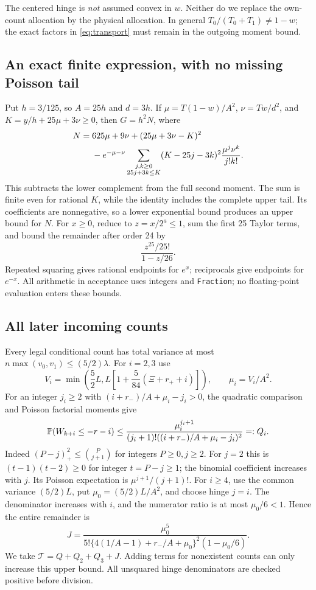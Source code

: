 \documentclass[11pt,a4paper]{article}
\begin{document}
The centered hinge is \emph{not} assumed convex in $w$. Neither do we
replace the own-count allocation by the physical allocation. In general
$T_0/(T_0+T_1)\ne1-w$; the exact factors in \eqref{eq:transport} must
remain in the outgoing moment bound.

\subsection*{An exact finite expression, with no missing Poisson tail}
Put $h=3/125$, so $A=25h$ and $d=3h$. If
$\mu=T(1-w)/A^2$, $\nu=Tw/d^2$, and
$K=y/h+25\mu+3\nu\ge0$, then $G=h^2N$, where
\begin{align}\label{eq:complement}
 N={}&625\mu+9\nu+(25\mu+3\nu-K)^2\\
 &-e^{-\mu-\nu}
 \sum_{\substack{j,k\ge0\\25j+3k\le K}}
       (K-25j-3k)^2\frac{\mu^j\nu^k}{j!k!}.\notag
\end{align}
This subtracts the lower complement from the full second moment. The sum
is finite even for rational $K$, while the identity includes the complete
upper tail. Its coefficients are nonnegative, so a lower exponential bound
produces an upper bound for $N$.
For $x\ge0$, reduce to $z=x/2^a\le1$, sum the first 25 Taylor terms,
and bound the remainder after order 24 by
\[
 \frac{z^{25}/25!}{1-z/26}.
\]
Repeated squaring gives rational endpoints for $e^x$; reciprocals give
endpoints for $e^{-x}$. All arithmetic in acceptance uses integers and
\texttt{Fraction}; no floating-point evaluation enters these bounds.

\subsection*{All later incoming counts}
Every legal conditional count has total variance at most
$n\max(v_0,v_1)\le(5/2)\lambda$. For $i=2,3$ use
\[
 V_i=\min\left(\frac52L,
       L\left[1+\frac5{84}(\Xi+r_++i)\right]\right),\qquad\mu_i=V_i/A^2.
\]
For an integer $j_i\ge2$ with $(i+r_-)/A+\mu_i-j_i>0$, the
quadratic comparison and Poisson factorial moments give
\begin{equation}\label{eq:later}
 \mathbb P(W_{k+i}\le-r-i)\le
 \frac{\mu_i^{j_i+1}}
 {(j_i+1)!((i+r_-)/A+\mu_i-j_i)^2}=:Q_i.
\end{equation}
Indeed $(P-j)_+^2\le\binom P{j+1}$ for integers $P\ge0,j\ge2$.
For $j=2$ this is $(t-1)(t-2)\ge0$ for integer $t=P-j\ge1$;
the binomial coefficient increases with $j$. Its Poisson expectation is
$\mu^{j+1}/(j+1)!$.
For $i\ge4$, use the common variance $(5/2)L$, put $\mu_0=(5/2)L/A^2$,
and choose hinge $j=i$. The denominator increases with $i$, and the
numerator ratio is at most $\mu_0/6<1$. Hence the entire remainder is
\begin{equation}\label{eq:infinite}
 J=\frac{\mu_0^5}
 {5!\{4(1/A-1)+r_-/A+\mu_0\}^2(1-\mu_0/6)}.
\end{equation}
We take $\mathcal T=Q+Q_2+Q_3+J$. Adding terms for nonexistent counts
can only increase this upper bound. All unsquared hinge denominators are
checked positive before division.
\end{document}
